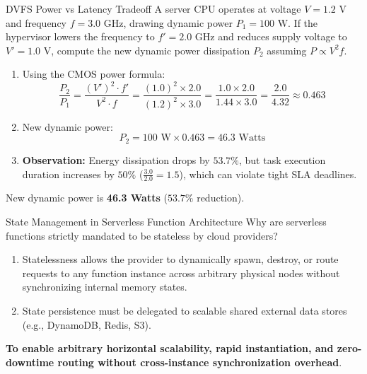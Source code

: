 \begin{solved}{DVFS Power vs Latency Tradeoff}
\Given A server CPU operates at voltage $V = 1.2\text{ V}$ and frequency $f = 3.0\text{ GHz}$, drawing dynamic power $P_1 = 100\text{ W}$. If the hypervisor lowers the frequency to $f' = 2.0\text{ GHz}$ and reduces supply voltage to $V' = 1.0\text{ V}$, compute the new dynamic power dissipation $P_2$ assuming $P \propto V^2 f$.
\Steps
\begin{enumerate}[leftmargin=*]
  \item Using the CMOS power formula:
  \begin{equation}
  \frac{P_2}{P_1} = \frac{(V')^2 \cdot f'}{V^2 \cdot f} = \frac{(1.0)^2 \times 2.0}{(1.2)^2 \times 3.0} = \frac{1.0 \times 2.0}{1.44 \times 3.0} = \frac{2.0}{4.32} \approx 0.463
  \end{equation}
  \item New dynamic power:
  \begin{equation}
  P_2 = 100\text{ W} \times 0.463 = 46.3\text{ Watts}
  \end{equation}
  \item \textbf{Observation:} Energy dissipation drops by $53.7\%$, but task execution duration increases by $50\%$ ($\frac{3.0}{2.0} = 1.5$), which can violate tight SLA deadlines.
\end{enumerate}
\Answer New dynamic power is \textbf{46.3 Watts} ($53.7\%$ reduction).
\end{solved}

\begin{solved}{State Management in Serverless Function Architecture}
\Given Why are serverless functions strictly mandated to be stateless by cloud providers?
\Steps
\begin{enumerate}[leftmargin=*]
  \item Statelessness allows the provider to dynamically spawn, destroy, or route requests to any function instance across arbitrary physical nodes without synchronizing internal memory states.
  \item State persistence must be delegated to scalable shared external data stores (e.g., DynamoDB, Redis, S3).
\end{enumerate}
\Answer \textbf{To enable arbitrary horizontal scalability, rapid instantiation, and zero-downtime routing without cross-instance synchronization overhead}.
\end{solved}

